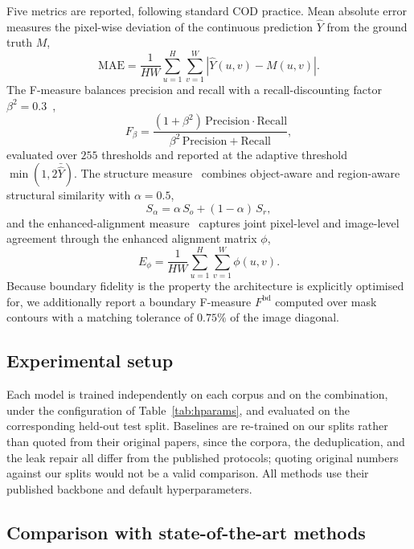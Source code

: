 \documentclass[3p,times,procedia]{elsarticle}
\newcommand{\Fbd}{F^{\mathrm{bd}}}
\begin{document}
Five metrics are reported, following standard COD practice. Mean absolute error measures the pixel-wise deviation of the continuous prediction $\hat{Y}$ from the ground truth $M$,
\begin{equation}
\mathrm{MAE} = \frac{1}{HW}\sum_{u=1}^{H}\sum_{v=1}^{W}\left|\hat{Y}(u,v) - M(u,v)\right| .
\end{equation}
The F-measure balances precision and recall with a recall-discounting factor $\beta^2 = 0.3$~\cite{wfmeasure},
\begin{equation}
F_\beta = \frac{(1+\beta^2)\,\mathrm{Precision} \cdot \mathrm{Recall}}{\beta^2\,\mathrm{Precision} + \mathrm{Recall}} ,
\end{equation}
evaluated over $255$ thresholds and reported at the adaptive threshold $\min(1, 2\bar{\hat{Y}})$. The structure measure~\cite{smeasure} combines object-aware and region-aware structural similarity with $\alpha = 0.5$,
\begin{equation}
S_\alpha = \alpha\, S_{o} + (1-\alpha)\, S_{r} ,
\end{equation}
and the enhanced-alignment measure~\cite{emeasure} captures joint pixel-level and image-level agreement through the enhanced alignment matrix $\phi$,
\begin{equation}
E_\phi = \frac{1}{HW}\sum_{u=1}^{H}\sum_{v=1}^{W}\phi(u,v).
\end{equation}
Because boundary fidelity is the property the architecture is explicitly optimised for, we additionally report a boundary F-measure $\Fbd$ computed over mask contours with a matching tolerance of $0.75\%$ of the image diagonal.

\subsection{Experimental setup}

Each model is trained independently on each corpus and on the combination, under the configuration of Table~\ref{tab:hparams}, and evaluated on the corresponding held-out test split. Baselines are re-trained on our splits rather than quoted from their original papers, since the corpora, the deduplication, and the leak repair all differ from the published protocols; quoting original numbers against our splits would not be a valid comparison. All methods use their published backbone and default hyperparameters.

\subsection{Comparison with state-of-the-art methods}
\end{document}
